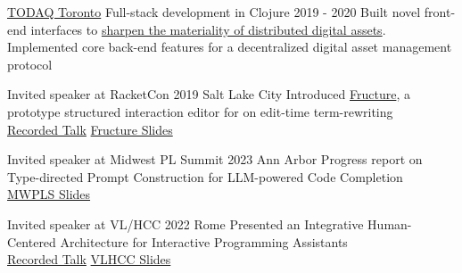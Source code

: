 \documentclass[10pt,a4paper]{article}
\begin{document}

  \headedsubsection
    {\href{http://todaqfinance.net/}{TODAQ Toronto} \sbull Full-stack development in Clojure}
    {2019 - 2020}
    {Built novel front-end interfaces to  \href{https://andrewblinn.com/portfolio/todaq/}{sharpen the materiality of distributed digital assets}.\\Implemented core back-end features for a decentralized digital asset management protocol}


  \headedsubsection
    {Invited speaker at RacketCon}
    {2019 \sbull Salt Lake City}
    {Introduced \href{https://github.com/disconcision/fructure}{Fructure}, a prototype structured interaction editor for on edit-time term-rewriting \\
    \sbull \href{https://www.youtube.com/watch?v=CnbVCNIh1NA}{Recorded Talk}
    \sbull \href{https://github.com/disconcision/fructure/blob/master/screenshots/REAL-RacketCon-Fructure-Talk.pdf}{Fructure Slides}}

  \headedsubsection
    {Invited speaker at Midwest PL Summit}
    {2023 \sbull Ann Arbor}
    {Progress report on Type-directed Prompt Construction for LLM-powered Code Completion \\
    \sbull \href{http://andrewblinn.com/papers/DRAFT-Type-directed-Prompt-Construction-for-LLM-powered-Programming-Assistants}{MWPLS Slides}}
    
  \headedsubsection
    {Invited speaker at VL/HCC}
    {2022 \sbull Rome}
    {Presented an Integrative Human-Centered Architecture for Interactive Programming Assistants \\
    \sbull \href{https://www.youtube.com/watch?v=G_9Yyut3ckw}{Recorded Talk}
    \sbull \href{https://docs.google.com/presentation/d/1lrclRzlx-ayd_iqOENyvCtnexBgTpkaSltPmgQQi_IE/edit?usp=sharing}{VLHCC Slides}}
    
\end{document}
